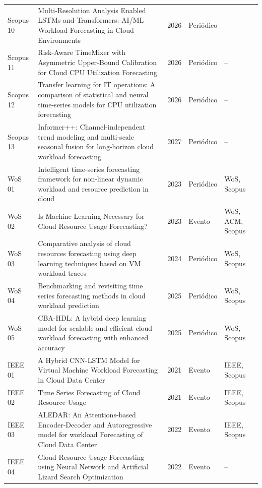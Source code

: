 {\begin{longtable}{p{1.4cm}p{9.3cm}p{0.9cm}p{1.5cm}p{1.7cm}}
Scopus 10 & Multi-Resolution Analysis Enabled LSTMs and Transformers: AI/ML Workload Forecasting in Cloud Environments \cite{pandeeswari2026} & 2026 & Periódico & -- \\
Scopus 11 & Risk-Aware TimeMixer with Asymmetric Upper-Bound Calibration for Cloud CPU Utilization Forecasting \cite{jin2026} & 2026 & Periódico & -- \\
Scopus 12 & Transfer learning for IT operations: A comparison of statistical and neural time-series models for CPU utilization forecasting \cite{denovi2026} & 2026 & Periódico & -- \\
Scopus 13 & Informer++: Channel-independent trend modeling and multi-scale seasonal fusion for long-horizon cloud workload forecasting \cite{zheng2027} & 2027 & Periódico & -- \\
WoS 01 & Intelligent time-series forecasting framework for non-linear dynamic workload and resource prediction in cloud \cite{ullah2023} & 2023 & Periódico & WoS, Scopus \\
WoS 02 & Is Machine Learning Necessary for Cloud Resource Usage Forecasting? \cite{christofidi2023a} & 2023 & Evento & WoS, ACM, Scopus \\
WoS 03 & Comparative analysis of cloud resources forecasting using deep learning techniques based on VM workload traces \cite{kollu2024} & 2024 & Periódico & WoS, Scopus \\
WoS 04 & Benchmarking and revisiting time series forecasting methods in cloud workload prediction \cite{lin2025a} & 2025 & Periódico & WoS, Scopus \\
WoS 05 & CBA-HDL: A hybrid deep learning model for scalable and efficient cloud workload forecasting with enhanced accuracy \cite{azarian2025} & 2025 & Periódico & WoS, Scopus \\
IEEE 01 & A Hybrid CNN-LSTM Model for Virtual Machine Workload Forecasting in Cloud Data Center \cite{leka2021} & 2021 & Evento & IEEE, Scopus \\
IEEE 02 & Time Series Forecasting of Cloud Resource Usage \cite{sarikaa2021} & 2021 & Evento & IEEE, Scopus \\
IEEE 03 & ALEDAR: An Attentions-based Encoder-Decoder and Autoregressive model for workload Forecasting of Cloud Data Center \cite{sun2022} & 2022 & Evento & IEEE, Scopus \\
IEEE 04 & Cloud Resource Usage Forecasting using Neural Network and Artificial Lizard Search Optimization \cite{vijayakumar2022} & 2022 & Evento & -- \\

\end{longtable}}

